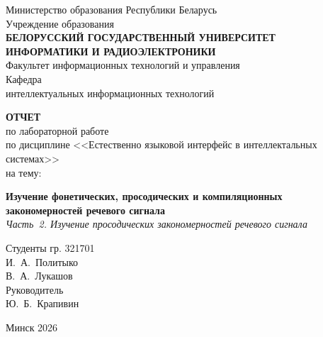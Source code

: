 \begin{titlepage}
	\centering
	\begin{minipage}{0.9\textwidth}
		\centering
		Министерство образования Республики Беларусь\\
		Учреждение образования\\
		{\large \textbf{БЕЛОРУССКИЙ ГОСУДАРСТВЕННЫЙ УНИВЕРСИТЕТ}}\\
		\textbf{ИНФОРМАТИКИ И РАДИОЭЛЕКТРОНИКИ}\\
		Факультет информационных технологий и управления\\
		Кафедра\\
		интеллектуальных информационных технологий
	\end{minipage}

	\vspace{3cm}

	{\large \textbf{ОТЧЕТ}}\\[0.3em]
	{\large по лабораторной работе}\\[0.3em]
	{\large по дисциплине <<Естественно языковой интерфейс в интеллектальных
	системах>>}\\[2em]
	на тему:

	\textbf{\large Изучение фонетических, просодических и компиляционных
	закономерностей речевого сигнала}\\[0.3em]
	{\large\itshape Часть~2. Изучение просодических закономерностей речевого
	сигнала}\\[1em]

	\begin{flushright}
		\begin{minipage}{0.5\textwidth}
			Студенты гр. 321701\\
			\hfill И.~А.~Политыко\\
			\hfill В.~А.~Лукашов\\[1em]
			Руководитель\\
			\hfill Ю.~Б.~Крапивин
		\end{minipage}
	\end{flushright}

	\vfill
	{\large Минск 2026}
\end{titlepage}
